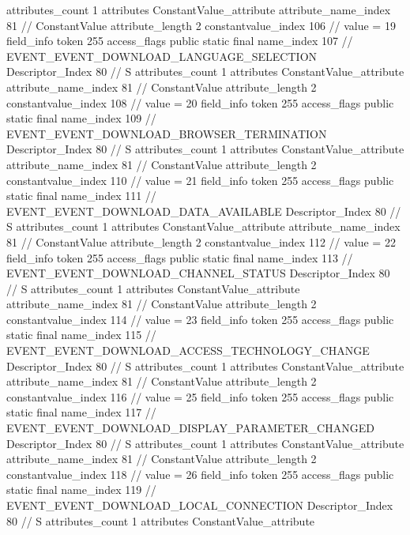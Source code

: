 {{{{{				attributes_count	1
				attributes {
				ConstantValue_attribute {
					attribute_name_index	81		// ConstantValue
					attribute_length	2
					constantvalue_index	106		// value = 19
				}
				}
			}
			field_info {
				token	255
				access_flags	public static final
				name_index	107		// EVENT_EVENT_DOWNLOAD_LANGUAGE_SELECTION
				Descriptor_Index	80		// S
				attributes_count	1
				attributes {
				ConstantValue_attribute {
					attribute_name_index	81		// ConstantValue
					attribute_length	2
					constantvalue_index	108		// value = 20
				}
				}
			}
			field_info {
				token	255
				access_flags	public static final
				name_index	109		// EVENT_EVENT_DOWNLOAD_BROWSER_TERMINATION
				Descriptor_Index	80		// S
				attributes_count	1
				attributes {
				ConstantValue_attribute {
					attribute_name_index	81		// ConstantValue
					attribute_length	2
					constantvalue_index	110		// value = 21
				}
				}
			}
			field_info {
				token	255
				access_flags	public static final
				name_index	111		// EVENT_EVENT_DOWNLOAD_DATA_AVAILABLE
				Descriptor_Index	80		// S
				attributes_count	1
				attributes {
				ConstantValue_attribute {
					attribute_name_index	81		// ConstantValue
					attribute_length	2
					constantvalue_index	112		// value = 22
				}
				}
			}
			field_info {
				token	255
				access_flags	public static final
				name_index	113		// EVENT_EVENT_DOWNLOAD_CHANNEL_STATUS
				Descriptor_Index	80		// S
				attributes_count	1
				attributes {
				ConstantValue_attribute {
					attribute_name_index	81		// ConstantValue
					attribute_length	2
					constantvalue_index	114		// value = 23
				}
				}
			}
			field_info {
				token	255
				access_flags	public static final
				name_index	115		// EVENT_EVENT_DOWNLOAD_ACCESS_TECHNOLOGY_CHANGE
				Descriptor_Index	80		// S
				attributes_count	1
				attributes {
				ConstantValue_attribute {
					attribute_name_index	81		// ConstantValue
					attribute_length	2
					constantvalue_index	116		// value = 25
				}
				}
			}
			field_info {
				token	255
				access_flags	public static final
				name_index	117		// EVENT_EVENT_DOWNLOAD_DISPLAY_PARAMETER_CHANGED
				Descriptor_Index	80		// S
				attributes_count	1
				attributes {
				ConstantValue_attribute {
					attribute_name_index	81		// ConstantValue
					attribute_length	2
					constantvalue_index	118		// value = 26
				}
				}
			}
			field_info {
				token	255
				access_flags	public static final
				name_index	119		// EVENT_EVENT_DOWNLOAD_LOCAL_CONNECTION
				Descriptor_Index	80		// S
				attributes_count	1
				attributes {
				ConstantValue_attribute {
}}}}}}}
